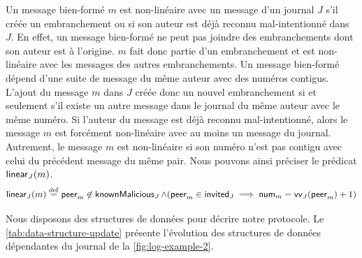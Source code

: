 Un message bien-formé $m$ est non-linéaire avec un message d'un journal $J$ s'il créée un embranchement ou si son auteur est déjà reconnu mal-intentionné dans $J$.
En effet, un message bien-formé ne peut pas joindre des embranchements dont son auteur est à l'origine.
$m$ fait donc partie d'un embranchement et est non-linéaire avec les messages des autres embranchements.
%
Un message bien-formé dépend d'une suite de message du même auteur avec des numéros contigus.
L'ajout du message $m$ dans $J$ créée donc un nouvel embranchement si et seulement s'il existe un autre message dans le journal du même auteur avec le même numéro.
Si l'auteur du message est déjà reconnu mal-intentionné, alors le message $m$ est forcément non-linéaire avec au moins un message du journal.
Autrement, le message $m$ est non-linéaire si son numéro n'est pas contigu avec celui du précédent message du même pair.
Nous pouvons ainsi préciser le prédicat $\operatorname{\mathsf{linear}}_J(m)$.
%
%
\begin{equation*}
\operatorname{\mathsf{linear}}_J(m) \overset{\mathrm{def}}{=}
\operatorname{\mathsf{peer}}_m \not\in \operatorname{\mathsf{knownMalicious}}_J \land (\operatorname{\mathsf{peer}}_m \in \operatorname{\mathsf{invited}}_J \implies \operatorname{\mathsf{num}}_m = \operatorname{\mathsf{vv}}_J(\operatorname{\mathsf{peer}}_m) + 1)
\end{equation*}

Nous disposons des structures de données pour décrire notre protocole.
Le \autoref{tab:data-structure-update} présente l'évolution des structures de données dépendantes du journal de la \autoref{fig:log-example-2}.

